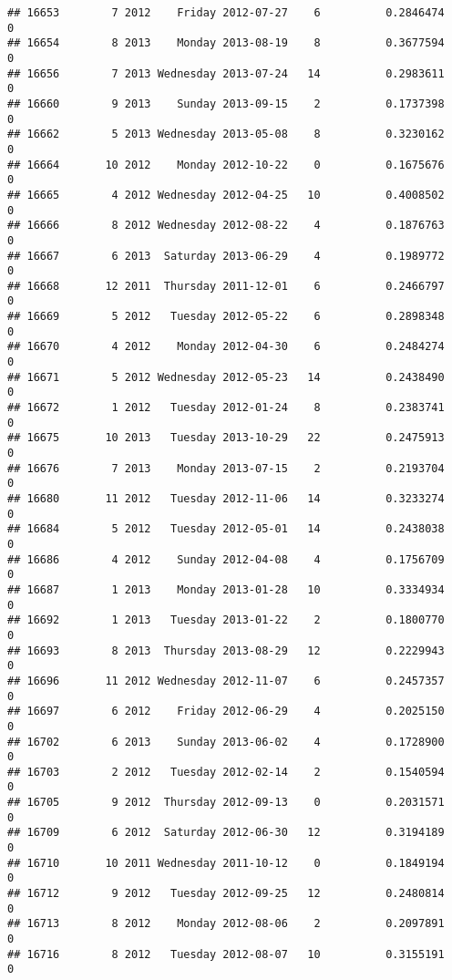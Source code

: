 \documentclass[
]{article}
\begin{document}
\begin{verbatim}
## 16653        7 2012    Friday 2012-07-27    6          0.2846474             0
## 16654        8 2013    Monday 2013-08-19    8          0.3677594             0
## 16656        7 2013 Wednesday 2013-07-24   14          0.2983611             0
## 16660        9 2013    Sunday 2013-09-15    2          0.1737398             0
## 16662        5 2013 Wednesday 2013-05-08    8          0.3230162             0
## 16664       10 2012    Monday 2012-10-22    0          0.1675676             0
## 16665        4 2012 Wednesday 2012-04-25   10          0.4008502             0
## 16666        8 2012 Wednesday 2012-08-22    4          0.1876763             0
## 16667        6 2013  Saturday 2013-06-29    4          0.1989772             0
## 16668       12 2011  Thursday 2011-12-01    6          0.2466797             0
## 16669        5 2012   Tuesday 2012-05-22    6          0.2898348             0
## 16670        4 2012    Monday 2012-04-30    6          0.2484274             0
## 16671        5 2012 Wednesday 2012-05-23   14          0.2438490             0
## 16672        1 2012   Tuesday 2012-01-24    8          0.2383741             0
## 16675       10 2013   Tuesday 2013-10-29   22          0.2475913             0
## 16676        7 2013    Monday 2013-07-15    2          0.2193704             0
## 16680       11 2012   Tuesday 2012-11-06   14          0.3233274             0
## 16684        5 2012   Tuesday 2012-05-01   14          0.2438038             0
## 16686        4 2012    Sunday 2012-04-08    4          0.1756709             0
## 16687        1 2013    Monday 2013-01-28   10          0.3334934             0
## 16692        1 2013   Tuesday 2013-01-22    2          0.1800770             0
## 16693        8 2013  Thursday 2013-08-29   12          0.2229943             0
## 16696       11 2012 Wednesday 2012-11-07    6          0.2457357             0
## 16697        6 2012    Friday 2012-06-29    4          0.2025150             0
## 16702        6 2013    Sunday 2013-06-02    4          0.1728900             0
## 16703        2 2012   Tuesday 2012-02-14    2          0.1540594             0
## 16705        9 2012  Thursday 2012-09-13    0          0.2031571             0
## 16709        6 2012  Saturday 2012-06-30   12          0.3194189             0
## 16710       10 2011 Wednesday 2011-10-12    0          0.1849194             0
## 16712        9 2012   Tuesday 2012-09-25   12          0.2480814             0
## 16713        8 2012    Monday 2012-08-06    2          0.2097891             0
## 16716        8 2012   Tuesday 2012-08-07   10          0.3155191             0

\end{verbatim}
\end{document}
